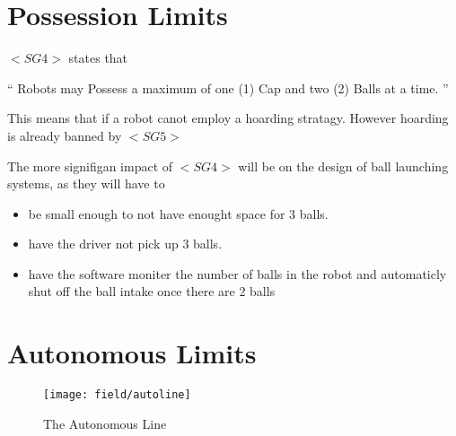 \documentclass[../../main.tex]{subfiles}
\begin{document}
\section{Possession Limits}

$<SG4>$ states that

`` Robots may Possess a maximum of one (1) Cap 
and two (2) Balls at a time. ''
\par

This means that if a robot canot employ a hoarding stratagy.
However hoarding is already banned by $<SG5>$ \par

The more signifigan impact of $<SG4>$ will be on the design of
ball launching systems, as they will have to

\begin{itemize}
    \item be small enough to not have enought space for 3 balls.
    \item have the driver not pick up 3 balls.
    \item have the software moniter the number of balls in the robot
          and automaticly shut off the ball intake once there are 2 balls
\end{itemize}

\section{Autonomous Limits}
\begin{figure}
    \centering    
    \texttt{[image: field/autoline]}
    \caption{The Autonomous Line}
    \label{fig:autoline}
\end{figure}
\end{document}
